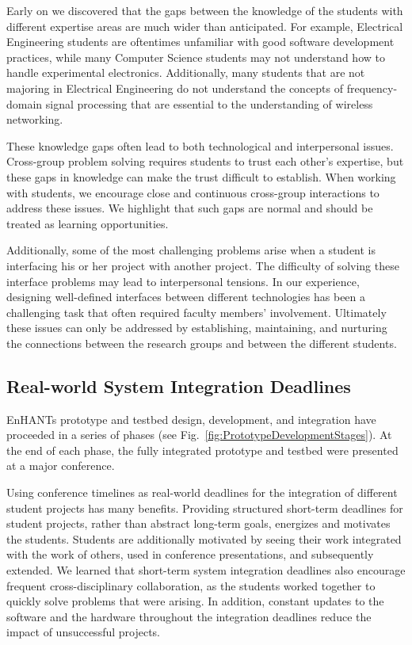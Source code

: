 \documentclass[journal,twopages]{IEEEtran}
\begin{document}
Early on we discovered that the gaps between the knowledge of the students with different expertise areas are much wider than anticipated. For example, Electrical Engineering students are oftentimes unfamiliar with good software development practices, while many Computer Science students may not understand how to handle experimental electronics. Additionally, many students that are not majoring in Electrical Engineering do not understand the concepts of frequency-domain signal processing that are essential to the understanding of wireless networking.

These knowledge gaps often lead to both technological and interpersonal issues. Cross-group problem solving requires students to trust each other's expertise, but these gaps in knowledge can make the trust difficult to establish.
When working with students, we encourage close and continuous cross-group interactions to address these issues.
We highlight that such gaps are normal and should be treated as learning opportunities. 

Additionally, some of the most challenging problems arise when a student is interfacing his or her project with another project. The difficulty of solving these interface problems may lead to interpersonal tensions.
In our experience, designing well-defined interfaces between different technologies has been a challenging task that often required faculty members' involvement. Ultimately these issues can only be addressed by
establishing, maintaining, and nurturing the connections between the research groups and between the different students.

\subsection{Real-world System Integration Deadlines}

EnHANTs prototype and testbed design, development, and integration have proceeded in a series of phases (see Fig.~\ref{fig:PrototypeDevelopmentStages}). At the end of each phase, the fully integrated prototype and testbed were presented at a major conference.

Using conference timelines as real-world deadlines for the integration of different student projects has many benefits. Providing structured short-term deadlines for student projects, rather than abstract long-term goals, energizes and motivates the students. Students are additionally motivated by seeing their work integrated with the work of others, used in conference presentations, and subsequently extended.
We learned that short-term system integration deadlines also encourage frequent cross-disciplinary collaboration, as the students worked together to quickly solve problems that were arising. In addition, constant updates to the software and the hardware throughout the integration deadlines reduce the impact of unsuccessful projects.
\end{document}
